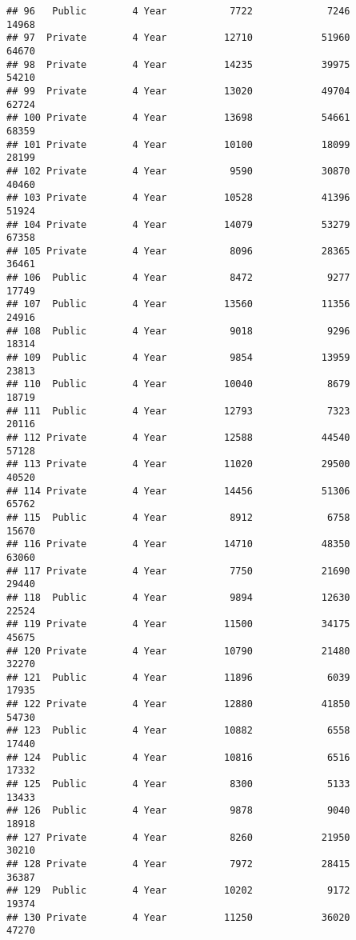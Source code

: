 \documentclass[
]{article}
\begin{document}
\begin{verbatim}
## 96   Public        4 Year           7722             7246          14968
## 97  Private        4 Year          12710            51960          64670
## 98  Private        4 Year          14235            39975          54210
## 99  Private        4 Year          13020            49704          62724
## 100 Private        4 Year          13698            54661          68359
## 101 Private        4 Year          10100            18099          28199
## 102 Private        4 Year           9590            30870          40460
## 103 Private        4 Year          10528            41396          51924
## 104 Private        4 Year          14079            53279          67358
## 105 Private        4 Year           8096            28365          36461
## 106  Public        4 Year           8472             9277          17749
## 107  Public        4 Year          13560            11356          24916
## 108  Public        4 Year           9018             9296          18314
## 109  Public        4 Year           9854            13959          23813
## 110  Public        4 Year          10040             8679          18719
## 111  Public        4 Year          12793             7323          20116
## 112 Private        4 Year          12588            44540          57128
## 113 Private        4 Year          11020            29500          40520
## 114 Private        4 Year          14456            51306          65762
## 115  Public        4 Year           8912             6758          15670
## 116 Private        4 Year          14710            48350          63060
## 117 Private        4 Year           7750            21690          29440
## 118  Public        4 Year           9894            12630          22524
## 119 Private        4 Year          11500            34175          45675
## 120 Private        4 Year          10790            21480          32270
## 121  Public        4 Year          11896             6039          17935
## 122 Private        4 Year          12880            41850          54730
## 123  Public        4 Year          10882             6558          17440
## 124  Public        4 Year          10816             6516          17332
## 125  Public        4 Year           8300             5133          13433
## 126  Public        4 Year           9878             9040          18918
## 127 Private        4 Year           8260            21950          30210
## 128 Private        4 Year           7972            28415          36387
## 129  Public        4 Year          10202             9172          19374
## 130 Private        4 Year          11250            36020          47270

\end{verbatim}
\end{document}
